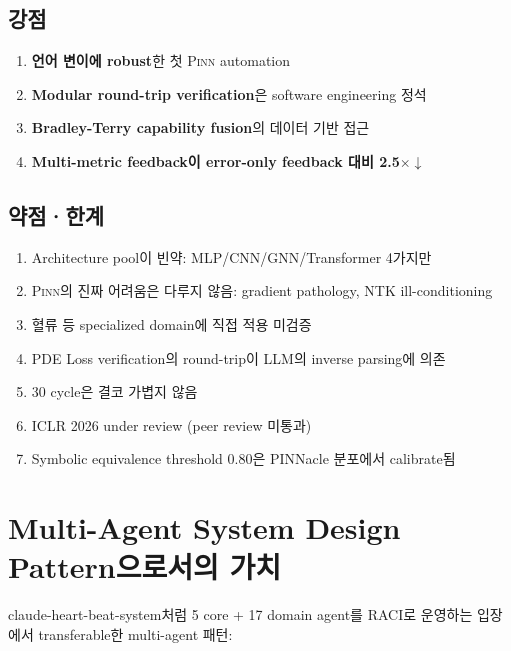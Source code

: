 \documentclass[11pt,a4paper,oneside]{report}
\newcommand{\pinn}{\textsc{Pinn}}
\begin{document}
\subsection{강점}
\begin{enumerate}
\item \textbf{언어 변이에 robust}한 첫 \pinn{} automation
\item \textbf{Modular round-trip verification}은 software engineering 정석
\item \textbf{Bradley-Terry capability fusion}의 데이터 기반 접근
\item \textbf{Multi-metric feedback이 error-only feedback 대비 2.5$\times \downarrow$}
\end{enumerate}

\subsection{약점·한계}
\begin{enumerate}
\item Architecture pool이 빈약: MLP/CNN/GNN/Transformer 4가지만
\item \pinn{}의 진짜 어려움은 다루지 않음: gradient pathology, NTK ill-conditioning
\item 혈류 등 specialized domain에 직접 적용 미검증
\item PDE Loss verification의 round-trip이 LLM의 inverse parsing에 의존
\item 30 cycle은 결코 가볍지 않음
\item ICLR 2026 under review (peer review 미통과)
\item Symbolic equivalence threshold 0.80은 PINNacle 분포에서 calibrate됨
\end{enumerate}

\section{Multi-Agent System Design Pattern으로서의 가치}

claude-heart-beat-system처럼 5 core + 17 domain agent를 RACI로 운영하는 입장에서 transferable한 multi-agent 패턴:
\end{document}
